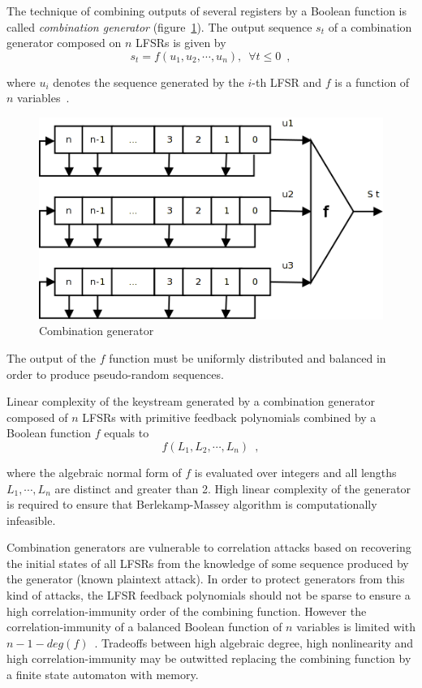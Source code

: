 The technique of combining outputs of several
registers by a Boolean function is called \textit{combination generator}
(figure~\ref{fig:comb-gen}). The output sequence $s_t$ of a combination generator
composed on $n$ LFSRs is given by
\begin{equation}
    \label{eqn:comb-gen-seq}
    s_t = f(u_1, u_2, \cdots, u_n), \enspace \forall t \leq 0 \enspace, 
\end{equation}

where $u_i$ denotes the sequence generated by the $i$-th LFSR and $f$ is a
function of $n$ variables~\cite{encyclopedia_of_cryptography}.
\begin{figure}[htbp]
    \centering
    \includegraphics[scale=0.5]{images/comb-gen}
    \caption{Combination generator}
    \label{fig:comb-gen}
\end{figure}
The output of the $f$ function must be uniformly distributed and balanced in
order to produce pseudo-random sequences.

Linear complexity of the keystream generated by a combination generator composed
of $n$ LFSRs with primitive feedback polynomials combined by a Boolean function
$f$ equals to 
\begin{equation}
    \label{eqn:lin-complexity}
    f(L_1, L_2, \cdots, L_n) \enspace, 
\end{equation}

where the algebraic normal form of $f$ is evaluated over
integers and all lengths $L_1, \cdots, L_n$ are distinct and greater than 2.
High linear complexity of the generator is required to ensure that
Berlekamp-Massey algorithm is computationally infeasible.

Combination generators are vulnerable to correlation attacks based on 
recovering the initial states of all LFSRs from the knowledge of some sequence
produced by the generator (known plaintext attack). In order to protect
generators from this kind of attacks, the LFSR feedback polynomials should not
be sparse to ensure a high correlation-immunity order of the combining function.
However the correlation-immunity of a balanced Boolean function of $n$ variables
is limited with $n - 1 - deg(f)$~\cite{encyclopedia_of_cryptography}. Tradeoffs
between high algebraic degree, high nonlinearity and high correlation-immunity
may be outwitted replacing the combining function by a finite state automaton
with memory.

